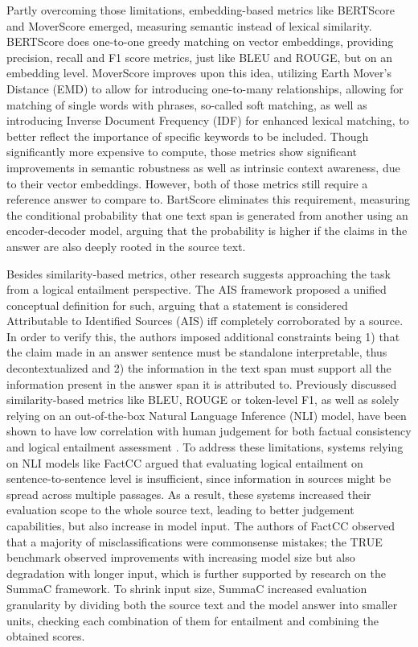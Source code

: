 Partly overcoming those limitations, embedding-based metrics like BERTScore \cite{bertScore} and MoverScore \cite{moverScore} emerged, measuring semantic instead of lexical similarity. BERTScore does one-to-one greedy matching on vector embeddings, providing precision, recall and F1 score metrics, just like BLEU and ROUGE, but on an embedding level. MoverScore improves upon this idea, utilizing Earth Mover's Distance (EMD) to allow for introducing one-to-many relationships, allowing for matching of single words with phrases, so-called soft matching, as well as introducing Inverse Document Frequency (IDF) for enhanced lexical matching, to better reflect the importance of specific keywords to be included. Though significantly more expensive to compute, those metrics show significant improvements in semantic robustness as well as intrinsic context awareness, due to their vector embeddings. However, both of those metrics still require a reference answer to compare to. BartScore \cite{bartScore} eliminates this requirement, measuring the conditional probability that one text span is generated from another using an encoder-decoder model, arguing that the probability is higher if the claims in the answer are also deeply rooted in the source text.

Besides similarity-based metrics, other research suggests approaching the task from a logical entailment perspective. The AIS \cite{measuringAttributionInNaturalLanguageGenerationModels} framework proposed a unified conceptual definition for such, arguing that a statement is considered Attributable to Identified Sources (AIS) iff completely corroborated by a source. In order to verify this, the authors imposed additional constraints being 1) that the claim made in an answer sentence must be standalone interpretable, thus decontextualized and 2) the information in the text span must support all the information present in the answer span it is attributed to. Previously discussed similarity-based metrics like BLEU, ROUGE or token-level F1, as well as solely relying on an out-of-the-box Natural Language Inference (NLI) model, have been shown to have low correlation with human judgement for both factual consistency and logical entailment assessment \cite{TRUE} \cite{evaluatingFactualConsistencyOfAbstractiveTextSummarization}. 
To address these limitations, systems relying on NLI models like FactCC \cite{evaluatingFactualConsistencyOfAbstractiveTextSummarization} argued that evaluating logical entailment on sentence-to-sentence level is insufficient, since information in sources might be spread across multiple passages. As a result, these systems increased their evaluation scope to the whole source text, leading to better judgement capabilities, but also increase in model input. The authors of FactCC observed that a majority of misclassifications were commonsense mistakes; the TRUE benchmark \cite{TRUE} observed improvements with increasing model size but also degradation with longer input, which is further supported by research on the SummaC \cite{summaC} framework.
To shrink input size, SummaC increased evaluation granularity by dividing both the source text and the model answer into smaller units, checking each combination of them for entailment and combining the obtained scores. 

